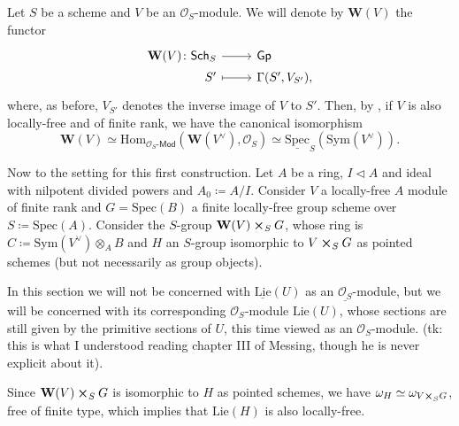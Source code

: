 \documentclass[../Main]{subfiles}
\begin{document}
\begin{defn}[]
	Let $S$ be a scheme and $V$ be an $\mathcal{O}_{ S }$-module.
	We will denote by $\mathbf{W}(V)$ the functor
	\begin{equation*}
	\begin{tikzcd}[row sep = 0ex
		,/tikz/column 1/.append style={anchor=base east}
		,/tikz/column 2/.append style={anchor=base west}]
		\mathbf{W}(V)\colon 
		\mathsf{Sch}_{ S } \arrow[r, "", rightarrow] &
		\mathsf{Gp} \\
		S' \arrow[r, "", mapsto] & 
		\Gamma(S', V_{S'})
	,\end{tikzcd}
	\end{equation*} 
	where, as before, $V_{S'}$ denotes the inverse image of
	$V$ to $S'$.
	Then, by \cite[Proposition 4.6.5]{SGA3-1}, if $V$ is also
	locally-free and of finite rank, we have the canonical isomorphism
	\begin{equation*}
		\mathbf{W}(V) \simeq
		\mathrm{Hom}_{ \mathcal{O}_{ S }\text{-}\mathsf{Mod} }
		\left(\mathbf{W}(V^\vee) , \mathcal{O}_{ S } \right) \simeq
		\underline{\mathrm{Spec}}_S(\mathrm{Sym}(V^\vee))
	.\end{equation*}
\end{defn}


Now to the setting for this first construction.
Let $A$ be a ring, $I \triangleleft A$ and ideal with nilpotent
divided powers and $A_0 \coloneqq A/I$.
Consider $V$ a locally-free $A$ module of finite rank
and $G = \mathrm{Spec}(B)$ a finite locally-free 
group scheme over $S \coloneqq \mathrm{Spec}(A)$.
Consider the $S$-group $\mathbf{W}(V) \cross_{ S } G$, whose ring is
$C \coloneqq \mathrm{Sym}(V^\vee) \otimes_A B$ and $H$ an $S$-group isomorphic
to $V \cross_{ S } G$ as pointed schemes (but not necessarily
as group objects).


\begin{rem}[]
	In this section we will not be concerned with $\underline{\mathrm{Lie}}(U)$
	as an $\underline{\mathcal{O}_{ S }}$-module, but we will be concerned 
	with its corresponding $\mathcal{O}_{ S }$-module $\mathrm{Lie}(U)$, 
	whose sections are still given by the primitive sections of $U$,
	this time viewed as an $\mathcal{O}_{ S }$-module.
	(tk: this is what I understood reading chapter III of Messing,
	though he is never explicit about it).
\end{rem}


\begin{rem}[]
	Since $\mathbf{W}(V) \cross_{ S } G$ is isomorphic to $H$ as pointed
	schemes, we have $\omega_H \simeq \omega_{V \cross_S G}$, free of finite type,
	which implies that $\mathrm{Lie}(H)$ is also locally-free.
\end{rem}
\end{document}
